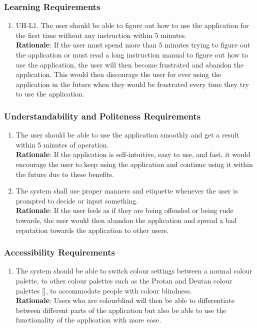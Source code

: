 \subsubsection{Learning Requirements}
\label{ssub:learning_requirements}
\begin{enumerate}[{UH-L}1. ]
	\item UH-L1. The user should be able to figure out how to use the application for the first time without any instruction within 5 minutes.
	\\ \textbf{Rationale}: If the user must spend more than 5 minutes trying to figure out the application or must read a long instruction manual to figure out how to use the application, the user will then become frustrated and abandon the application. This would then discourage the user for ever using the application in the future when they would be frustrated every time they try to use the application.	
\end{enumerate}

\subsubsection{Understandability and Politeness Requirements}
\label{ssub:understandability_and_politeness_requirements}
\begin{enumerate}[{UH-UP}1. ]
	\item The user should be able to use the application smoothly and get a result within 5 minutes of operation.\\ \textbf{Rationale}: If the application is self-intuitive, easy to use, and fast, it would encourage the user to keep using the application and continue using it within the future due to these benefits.
	\item The system shall use proper manners and etiquette whenever the user is prompted to decide or input something.\\ \textbf{Rationale}: If the user feels as if they are being offended or being rude towards, the user would then abandon the application and spread a bad reputation towards the application to other users.
\end{enumerate}


\subsubsection{Accessibility Requirements}
\label{ssub:accessibility_requirements}
\begin{enumerate}[{UH-A}1. ]
	\item The system should be able to switch colour settings between a normal colour palette, to other colour palettes such as the Protan and Deutan colour palettes [], to accommodate people with colour blindness.
	\\ \textbf{Rationale}: Users who are colourblind will then be able to differentiate between different parts of the application but also be able to use the functionality of the application with more ease.
	
\end{enumerate}

